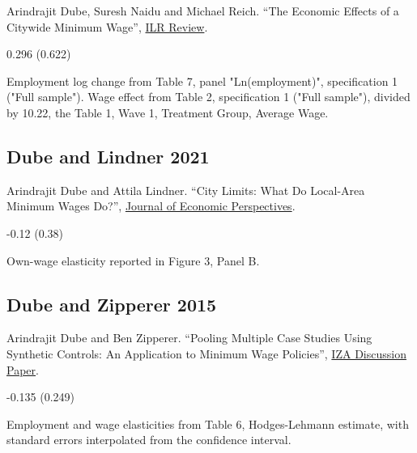 \noindent Arindrajit Dube, Suresh Naidu and Michael Reich. ``The Economic Effects of a Citywide Minimum Wage'', \href{https://doi.org/10.1177/001979390706000404}{ILR Review}.

\vspace{0.7em}

 0.296 (0.622)

\vspace{0.7em}

 Employment log change from Table 7, panel "Ln(employment)", specification 1 ("Full sample"). Wage effect from Table 2, specification 1 ("Full sample"), divided by 10.22, the Table 1, Wave 1, Treatment Group, Average Wage.

\subsection*{Dube and Lindner 2021}
\vspace{-0.7em}

\noindent Arindrajit Dube and Attila Lindner. ``City Limits: What Do Local-Area Minimum Wages Do?'', \href{https://doi.org/10.1257/jep.35.1.27}{Journal of Economic Perspectives}.

\vspace{0.7em}

 -0.12 (0.38)

\vspace{0.7em}

 Own-wage elasticity reported in Figure 3, Panel B.

\subsection*{Dube and Zipperer 2015}
\vspace{-0.7em}

\noindent Arindrajit Dube and Ben Zipperer. ``Pooling Multiple Case Studies Using Synthetic Controls: An Application to Minimum Wage Policies'', \href{https://docs.iza.org/dp8944.pdf}{IZA Discussion Paper}.

\vspace{0.7em}

 -0.135 (0.249)

\vspace{0.7em}

 Employment and wage elasticities from Table 6, Hodges-Lehmann estimate, with standard errors interpolated from the confidence interval.

